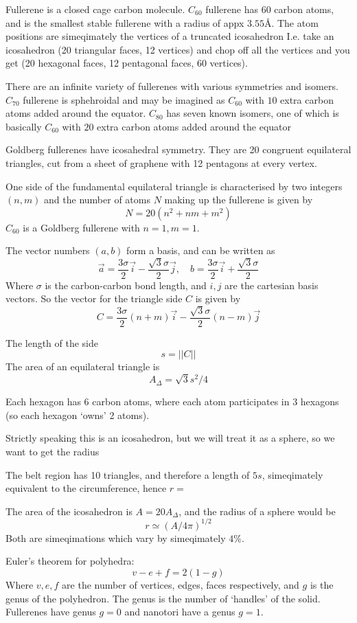 \documentclass{X:/Documents/Coding/Latex/myassignment}
\begin{document}
Fullerene is a closed cage carbon molecule. $C_{60}$ fullerene has 60 carbon atoms, and is the smallest stable fullerene with a radius of appx $3.55$\AA. The atom positions are simeqimately the vertices of a truncated icosahedron I.e. take an icosahedron (20 triangular faces, 12 vertices) and chop off all the vertices and you get (20 hexagonal faces, 12 pentagonal faces, 60 vertices).

There are an infinite variety of fullerenes with various symmetries and isomers. $C_{70}$ fullerene is sphehroidal and may be imagined as $C_{60}$ with $10$ extra carbon atoms added around the equator. $C_{80}$ has seven known isomers, one of which is basically $C_{60}$ with $20$ extra carbon atoms added around the equator

Goldberg fullerenes have icosahedral symmetry.
They are 20 congruent equilateral triangles, cut from a sheet of graphene with 12 pentagons at every vertex.

One side of the fundamental equilateral triangle is characterised by two integers $(n,m)$ and the number of atoms $N$ making up the fullerene is given by
\[N = 20 (n^2 + nm + m^2)\]
$C_{60}$ is a Goldberg fullerene with $n=1,m=1$.

The vector numbers $(a,b)$ form a basis, and can be written as
\[\vec a = \frac{3\sigma}{2} \vec i - \frac{\sqrt{3}\sigma}{2} \vec j , \quad b =\frac{3\sigma}{2} \vec i + \frac{\sqrt{3}\sigma}{2}  \]
Where $\sigma$ is the carbon-carbon bond length, and $i,j$ are the cartesian basis vectors. So the vector for the triangle side $C$ is given by
\[C = \frac{3\sigma}{2}(n+m) \vec i - \frac{\sqrt{3}\sigma}{2} (n-m)\vec j\]

The length of the side 
\[s = ||C||\]
The area of an equilateral triangle is 
\[A_{\Delta} = \sqrt{3} s^2/4\]

Each hexagon has 6 carbon atoms, where each atom participates in 3 hexagons (so each hexagon `owns' 2 atoms).

Strictly speaking this is an icosahedron, but we will treat it as a sphere, so we want to get the radius

The belt region has 10 triangles, and therefore a length of $5s$, simeqimately equivalent to the circumference, hence $r = $

The area of the icosahedron is $A = 20 A_{\Delta}$, and the radius of a sphere would be
\[r \simeq (A/4\pi)^{1/2}\]
Both are simeqimations which vary by simeqimately $4\%$.


Euler's theorem for polyhedra:
\[v-e+f = 2(1-g)\]
Where $v,e,f$ are the number of vertices, edges, faces respectively, and $g$ is the genus of the polyhedron. The genus is the number of `handles' of the solid. Fullerenes have genus $g=0$ and nanotori have a genus $g=1$. 
\end{document}
